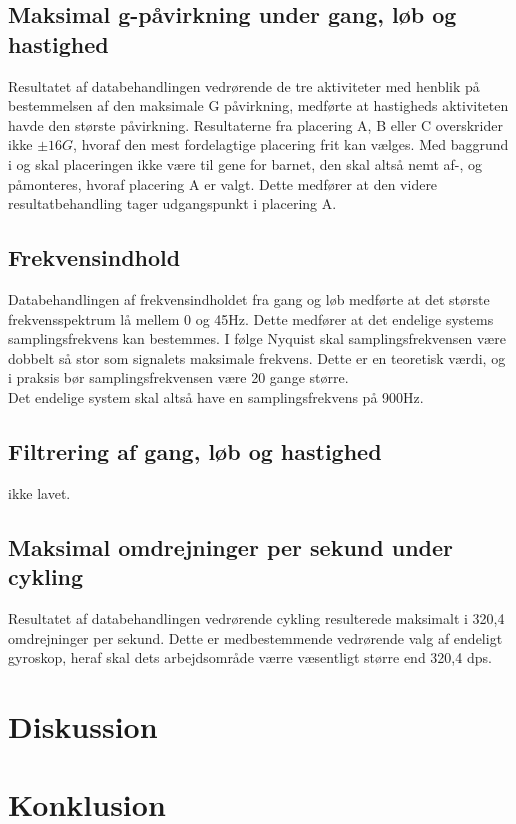 \subsection{Maksimal g-påvirkning under gang, løb og hastighed} \label{app:maxg}
Resultatet af databehandlingen vedrørende de tre aktiviteter med henblik på bestemmelsen af den maksimale G påvirkning, medførte at hastigheds aktiviteten havde den største påvirkning. Resultaterne fra placering A, B eller C overskrider ikke $\pm 16G$, hvoraf den mest fordelagtige placering frit kan vælges. Med baggrund i  og  skal placeringen ikke være til gene for barnet, den skal altså nemt af-, og påmonteres, hvoraf placering A er valgt. Dette medfører at den videre resultatbehandling tager udgangspunkt i placering A. 

\subsection{Frekvensindhold}
Databehandlingen af frekvensindholdet fra gang og løb medførte at det største frekvensspektrum lå mellem 0 og 45Hz. Dette medfører at det endelige systems samplingsfrekvens kan bestemmes. I følge Nyquist skal samplingsfrekvensen være dobbelt så stor som signalets maksimale frekvens. Dette er en teoretisk værdi, og i praksis bør samplingsfrekvensen være 20 gange større. \\
Det endelige system skal altså have en samplingsfrekvens på 900Hz.

\subsection{Filtrering af gang, løb og hastighed}
ikke lavet. 

\subsection{Maksimal omdrejninger per sekund under cykling}
Resultatet af databehandlingen vedrørende cykling resulterede maksimalt i 320,4 omdrejninger per sekund. Dette er medbestemmende vedrørende valg af endeligt gyroskop, heraf skal dets arbejdsområde værre væsentligt større end 320,4 dps. 


\section{Diskussion}

\section{Konklusion}

